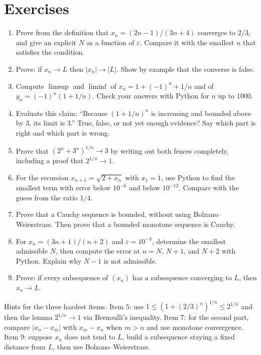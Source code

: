 \section{Exercises}

\begin{latihan}
\begin{enumerate}
  \item Prove from the definition that $x_n=(2n-1)/(3n+4)$ converges to $2/3$, and give
        an explicit $N$ as a function of $\varepsilon$. Compare it with the smallest
        $n$ that satisfies the condition.
  \item Prove: if $x_n \to L$ then $|x_n| \to |L|$. Show by example that the converse is
        false.
  \item Compute $\limsup$ and $\liminf$ of $x_n=1+(-1)^n+1/n$ and of
        $y_n=(-1)^n(1+1/n)$. Check your answers with Python for $n$ up to $1000$.
  \item Evaluate this claim: ``Because $(1+1/n)^n$ is increasing and bounded above by
        $3$, its limit is $3$.'' True, false, or not yet enough evidence? Say which part
        is right and which part is wrong.
  \item Prove that $(2^n+3^n)^{1/n} \to 3$ by writing out both fences completely,
        including a proof that $2^{1/n} \to 1$.
  \item For the recursion $x_{n+1}=\sqrt{2+x_n}$ with $x_1=1$, use Python to find the
        smallest term with error below $10^{-6}$ and below $10^{-12}$. Compare with the
        guess from the ratio $1/4$.
  \item Prove that a Cauchy sequence is bounded, without using Bolzano--Weierstrass.
        Then prove that a bounded monotone sequence is Cauchy.
  \item For $x_n=(3n+1)/(n+2)$ and $\varepsilon=10^{-3}$, determine the smallest
        admissible $N$, then compute the error at $n=N$, $N+1$, and $N+2$ with Python.
        Explain why $N-1$ is not admissible.
  \item Prove: if every subsequence of $(x_n)$ has a subsequence converging to $L$, then
        $x_n \to L$.
\end{enumerate}

Hints for the three hardest items. Item 5: use
$1 \le (1+(2/3)^n)^{1/n} \le 2^{1/n}$ and then the lemma $2^{1/n} \to 1$ via Bernoulli's
inequality. Item 7: for the second part, compare $|x_n-x_m|$ with $x_m-x_n$ when $m>n$
and use monotone convergence. Item 9: suppose $x_n$ does not tend to $L$, build a
subsequence staying a fixed distance from $L$, then use Bolzano--Weierstrass.
\end{latihan}

